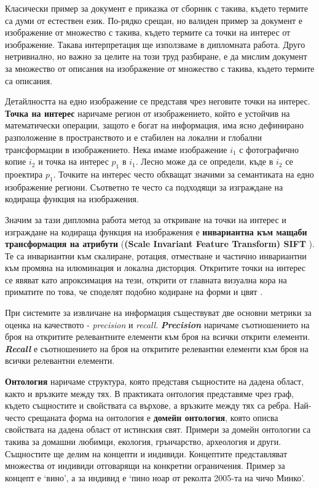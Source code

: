 \documentclass[a4paper,12pt]{article}
\begin{document}
\bigbreak

Класически пример за документ е приказка от сборник с такива, където термите са думи от естествен език. По-рядко срещан, но валиден пример за документ е изображение от множество с такива, където термите са точки на интерес от изображение. Такава интерпретация ще използваме в дипломната работа. Друго нетривиално, но важно за целите на този труд разбиране, е да мислим документ за множество от описания на изображение от множество с такива, където термите са описания.

\bigbreak

Детайлността на едно изображение се представя чрез неговите точки на интерес. \textbf{Точка на интерес} наричаме регион от изображението, който е устойчив на математически операции, защото е богат на информация, има ясно дефинирано разположение в пространството и е стабилен на локални и глобални трансформации в изображението. Нека имаме изображение $i_1$ с фотографично копие $i_2$ и точка на интерес $p_1$ в $i_1$. Лесно може да се определи, къде в $i_2$ се проектира $p_1$. Точките на интерес често обхващат значими за семантиката на едно изображение региони. Съответно те често са подходящи за изграждане на кодираща функция на изображения.

\bigbreak

Значим за тази дипломна работа метод за откриване на точки на интерес и изграждане на кодираща функция на изображения е \textbf{инвариантна към мащаби трансформация на атрибути} (\textbf{(Scale Invariant Feature Transform) SIFT} \cite{sift}). Те са инвариантни към скалиране, ротация, отместване и частично инвариантни към промяна на илюминация и локална дисторция. Откритите точки на интерес се явяват като апроксимация на тези, открити от главната визуална кора на приматите по това, че споделят подобно кодиране на форми и цвят \cite{primatevisualcortex}.

\bigbreak

При системите за извличане на информация съществуват две основни метрики за оценка на качеството - \textit{precision} и \textit{recall}. \textbf{\textit{Precision}} наричаме съотношението на броя на откритите релевантните елементи към броя на всички открити елементи. \textbf{\textit{Recall}} е съотношението на броя на откритите релевантни елементи към броя на всички релевантни елементи.

\bigbreak

\textbf{Онтология} наричаме структура, която представя същностите на дадена област, както и връзките между тях. В практиката онтология представяме чрез граф, където същностите и свойствата са върхове, а връзките между тях са ребра. Най-често срещаната форма на онтология е \textbf{домейн онтология}, която описва свойствата на дадена област от истинския свят. Примери за домейн онтологии са такива за домашни любимци, екология, грънчарство, археология и други. Същностите ще делим на концепти и индивиди. Концептите представляват множества от индивиди отговарящи на конкретни ограничения. Пример за концепт е `вино', а за индивид е `пино ноар от реколта 2005-та на чичо Минко'.
\end{document}
